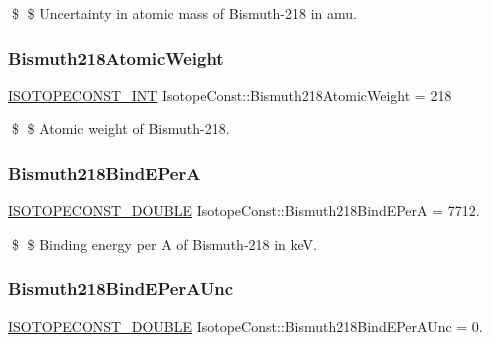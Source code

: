 \$ \$ Uncertainty in atomic mass of Bismuth-\/218 in amu. \mbox{\label{group___isotope_const-_bismuth-_bi218_ga82c41bd63224026872a147982b7467b9}} 
\subsubsection{\texorpdfstring{Bismuth218\+Atomic\+Weight}{Bismuth218AtomicWeight}}
{\footnotesize\ttfamily \mbox{\hyperlink{group___isotope_const-_macros_ga5f18360b3e99483a35c32d789e62621c}{I\+S\+O\+T\+O\+P\+E\+C\+O\+N\+S\+T\+\_\+\+I\+NT}} Isotope\+Const\+::\+Bismuth218\+Atomic\+Weight = 218}

\$ \$ Atomic weight of Bismuth-\/218. \mbox{\label{group___isotope_const-_bismuth-_bi218_ga2d0d65d8119471e1149da3408f01f0f0}} 
\subsubsection{\texorpdfstring{Bismuth218\+Bind\+E\+PerA}{Bismuth218BindEPerA}}
{\footnotesize\ttfamily \mbox{\hyperlink{group___isotope_const-_macros_ga8f45a7272ce02c0b4c65c44636ed719a}{I\+S\+O\+T\+O\+P\+E\+C\+O\+N\+S\+T\+\_\+\+D\+O\+U\+B\+LE}} Isotope\+Const\+::\+Bismuth218\+Bind\+E\+PerA = 7712.}

\$ \$ Binding energy per A of Bismuth-\/218 in keV. \mbox{\label{group___isotope_const-_bismuth-_bi218_gadd2cd234f19b22cdae732834dfac6bea}} 
\subsubsection{\texorpdfstring{Bismuth218\+Bind\+E\+Per\+A\+Unc}{Bismuth218BindEPerAUnc}}
{\footnotesize\ttfamily \mbox{\hyperlink{group___isotope_const-_macros_ga8f45a7272ce02c0b4c65c44636ed719a}{I\+S\+O\+T\+O\+P\+E\+C\+O\+N\+S\+T\+\_\+\+D\+O\+U\+B\+LE}} Isotope\+Const\+::\+Bismuth218\+Bind\+E\+Per\+A\+Unc = 0.}

